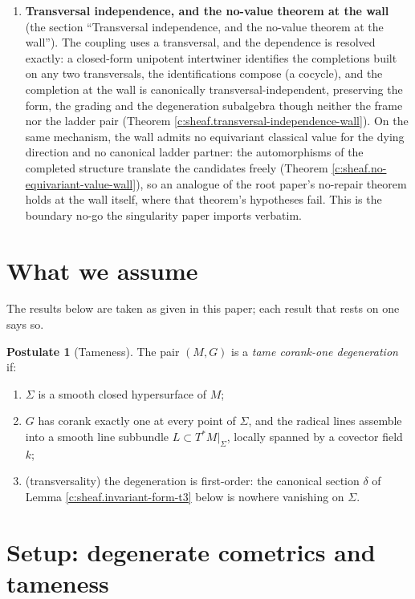 \documentclass[11pt]{article}
\theoremstyle{definition}
\newtheorem{postulate}[theorem]{Postulate}
\theoremstyle{plain}
\providecommand{\Sig}{}\renewcommand{\Sig}{\Sigma}
\providecommand{\shL}{}\renewcommand{\shL}{L}
\begin{document}
\begin{enumerate}
\item \textbf{Transversal independence, and the no-value theorem at the wall} (the section ``Transversal independence, and the no-value theorem at the wall''). The coupling uses a transversal, and the dependence is resolved exactly: a closed-form unipotent intertwiner identifies the completions built on any two transversals, the identifications compose (a cocycle), and the completion at the wall is canonically transversal-independent, preserving the form, the grading and the degeneration subalgebra though neither the frame nor the ladder pair (Theorem \ref{c:sheaf.transversal-independence-wall}). On the same mechanism, the wall admits no equivariant classical value for the dying direction and no canonical ladder partner: the automorphisms of the completed structure translate the candidates freely (Theorem \ref{c:sheaf.no-equivariant-value-wall}), so an analogue of the root paper's no-repair theorem holds at the wall itself, where that theorem's hypotheses fail. This is the boundary no-go the singularity paper imports verbatim.
\end{enumerate}

\section*{What we assume}
The results below are taken as given in this paper; each result that rests on one says so.
\begin{postulate}[Tameness]\label{c:sheaf.tameness}
The pair $(M, G)$ is a \emph{tame corank-one degeneration} if:
\begin{enumerate}
\item[(T1)] $\Sig$ is a smooth closed hypersurface of $M$;
\item[(T2)] $G$ has corank exactly one at every point of $\Sig$, and the radical lines assemble into a smooth line subbundle $\shL \subset T^*M|_\Sig$, locally spanned by a covector field $k$;
\item[(T3)] (transversality) the degeneration is first-order: the canonical section $\delta$ of Lemma \ref{c:sheaf.invariant-form-t3} below is nowhere vanishing on $\Sig$.
\end{enumerate}
\end{postulate}

\section{Setup: degenerate cometrics and tameness}
\end{document}
